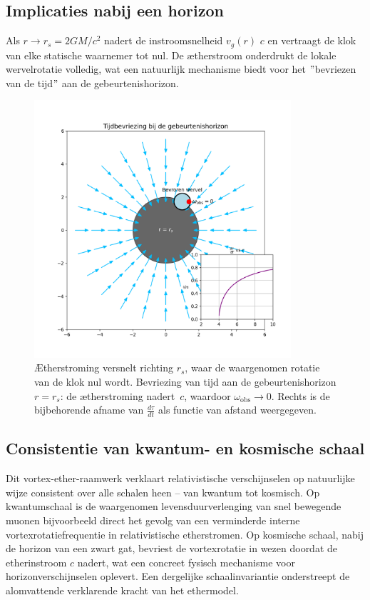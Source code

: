 \subsection*{Implicaties nabij een horizon}

Als $r \to r_s = 2GM/c^2$ nadert de instroomsnelheid $v_g(r)$ $c$ en vertraagt de klok van elke statische waarnemer tot nul. De ætherstroom onderdrukt de lokale wervelrotatie volledig, wat een natuurlijk mechanisme biedt voor het \("\)bevriezen van de tijd\("\) aan de gebeurtenishorizon.


\begin{figure}[htbp]
    \centering
    \includegraphics[width=0.85\textwidth]{10-HorizonTijdsbevriezing}
    \caption{Ætherstroming versnelt richting $r_s$, waar de waargenomen rotatie van de klok nul wordt. Bevriezing van tijd aan de gebeurtenishorizon $r = r_s$: de ætherstroming nadert~$c$, waardoor $\omega_{\mathrm{obs}} \to 0$. Rechts is de bijbehorende afname van $\frac{d\tau}{dt}$ als functie van afstand weergegeven.}
    \label{fig:HorizonTijdsbevriezing}
\end{figure}

\subsection*{Consistentie van kwantum- en kosmische schaal}

Dit vortex-ether-raamwerk verklaart relativistische verschijnselen op natuurlijke wijze consistent over alle schalen heen – van kwantum tot kosmisch. Op kwantumschaal is de waargenomen levensduurverlenging van snel bewegende muonen bijvoorbeeld direct het gevolg van een verminderde interne vortexrotatiefrequentie in relativistische etherstromen. Op kosmische schaal, nabij de horizon van een zwart gat, bevriest de vortexrotatie in wezen doordat de etherinstroom $c$ nadert, wat een concreet fysisch mechanisme voor horizonverschijnselen oplevert. Een dergelijke schaalinvariantie onderstreept de alomvattende verklarende kracht van het ethermodel.

